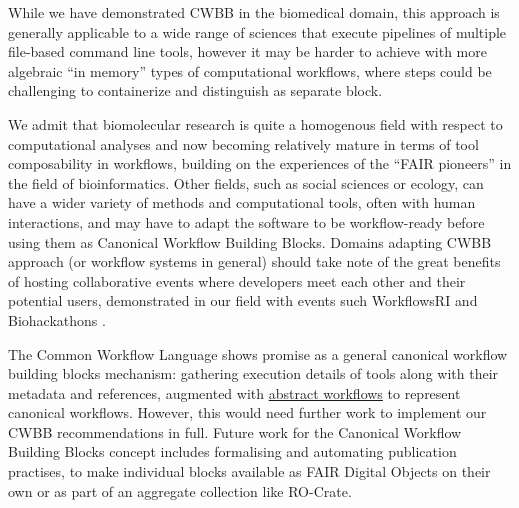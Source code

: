 While we have demonstrated CWBB in the biomedical domain, this approach
is generally applicable to a wide range of sciences that execute
pipelines of multiple file-based command line tools, however it may be
harder to achieve with more algebraic ``in memory'' types of
computational workflows, where steps could be challenging to
containerize and distinguish as separate block.

We admit that biomolecular research is quite a homogenous field with
respect to computational analyses and now becoming relatively mature in
terms of tool composability in workflows, building on the experiences of
the ``FAIR pioneers'' in the field of bioinformatics. Other fields, such
as social sciences or ecology, can have a wider variety of methods and
computational tools, often with human interactions, and may have to
adapt the software to be workflow-ready \cite{ch6-37} before using them as
Canonical Workflow Building Blocks. Domains adapting CWBB approach (or
workflow systems in general) should take note of the great benefits of
hosting collaborative events where developers meet each other and their
potential users, demonstrated in our field with events such WorkflowsRI
\cite{ch6-39} and Biohackathons \cite{ch6-40}.

The Common Workflow Language shows promise as a general canonical
workflow building blocks mechanism: gathering execution details of tools
along with their metadata and references, augmented with
\href{https://docs.bioexcel.eu/cwl-best-practice-guide/devpractice/partial.html\#using-abstract-operations-as-placeholders}{abstract
workflows} to represent canonical workflows. However, this would need
further work to implement our CWBB recommendations in full. Future work
for the Canonical Workflow Building Blocks concept includes formalising
and automating publication practises, to make individual blocks
available as FAIR Digital Objects on their own or as part of an
aggregate collection like RO-Crate.
